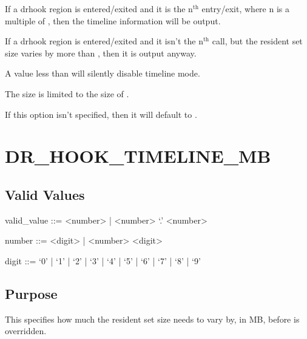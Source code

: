 \documentclass[letterpaper,10pt,english]{sphinxmanual}
\begin{document}
\sphinxAtStartPar
If a drhook region is entered/exited and it is the n$^{\text{th}}$ entry/exit, where n is a multiple of , then the timeline information will be output.

\sphinxAtStartPar
If a drhook region is entered/exited and it isn’t the n$^{\text{th}}$ call, but the resident set size varies by more than {\hyperref[\detokenize{flag/flag:dr-hook-timeline-mb}]{}}, then it is output anyway.

\sphinxAtStartPar
A value less than  will silently disable timeline mode.

\sphinxAtStartPar
The size is limited to the size of .

\sphinxAtStartPar
If this option isn’t specified, then it will default to .


\section{DR\_HOOK\_TIMELINE\_MB}
\label{\detokenize{flag/flag:dr-hook-timeline-mb}}\label{\detokenize{flag/flag:id117}}

\subsection{Valid Values}
\label{\detokenize{flag/flag:id118}}
\begin{DUlineblock}{0em}
\item[] valid\_value ::= \textless{}number\textgreater{} | \textless{}number\textgreater{} ‘.’ \textless{}number\textgreater{}
\item[] number ::= \textless{}digit\textgreater{} | \textless{}number\textgreater{} \textless{}digit\textgreater{}
\item[] digit ::= ‘0’ | ‘1’ | ‘2’ | ‘3’ | ‘4’ | ‘5’ | ‘6’ | ‘7’ | ‘8’ | ‘9’
\end{DUlineblock}


\subsection{Purpose}
\label{\detokenize{flag/flag:id119}}
\sphinxAtStartPar
This specifies how much the resident set size needs to vary by, in MB, before {\hyperref[\detokenize{flag/flag:dr-hook-timeline-freq}]{}} is overridden.
\end{document}
